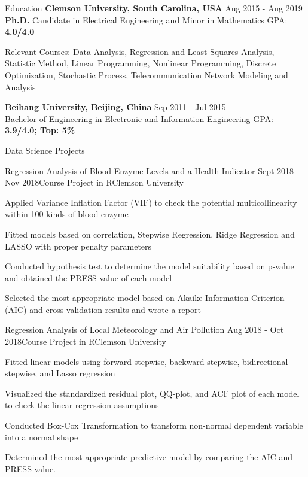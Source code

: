 \documentclass{resume} %
\begin{document}
\begin{rSection}{Education}
{\bf Clemson University, South Carolina, USA} \hfill { Aug 2015 - Aug 2019} \\ 
{\textbf{Ph.D.} Candidate in Electrical Engineering and Minor in Mathematics} \hfill { GPA: \bf 4.0/4.0}


Relevant Courses: Data Analysis, Regression and Least Squares Analysis, Statistic Method, 
Linear Programming, Nonlinear Programming, Discrete Optimization, Stochastic Process, Telecommunication Network Modeling and Analysis


{\bf Beihang University, Beijing, China} \hfill { Sep 2011 - Jul 2015} \\ 
{ Bachelor of Engineering  in Electronic and Information Engineering} \hfill { GPA: \bf 3.9/4.0; Top: 5\%}

\end{rSection}


\begin{rSection}{Data Science Projects}	
	\begin{rSubsection}{Regression Analysis of Blood Enzyme Levels and a Health Indicator}
		{Sept 2018 - Nov 2018}{Course Project in R}{Clemson University}		
		\setlength{\parindent}{2em} \item Applied Variance Inflation Factor (VIF) to check the potential multicollinearity within 100 kinds of blood enzyme		
		\item Fitted models based on correlation, Stepwise Regression, Ridge Regression and LASSO with proper penalty parameters
		\item Conducted hypothesis test to determine the model suitability based on p-value and obtained the PRESS value of each model
		\item Selected the most appropriate model based on Akaike Information Criterion (AIC) and cross validation results and wrote a report		
	\end{rSubsection}	
	
		\begin{rSubsection}{Regression Analysis of Local Meteorology and Air Pollution}
			{Aug 2018 - Oct 2018}{Course Project in R}{Clemson University}		
			\setlength{\parindent}{2em} \item Fitted linear models using forward stepwise, backward stepwise, bidirectional stepwise, and Lasso regression
			\item Visualized the standardized residual plot, QQ-plot, and ACF plot of each model to check the linear regression assumptions
			\item Conducted Box-Cox Transformation to transform non-normal dependent variable into a normal shape
			\item Determined the most appropriate predictive model by comparing the AIC and PRESS value.				
		\end{rSubsection}	
\end{rSection}
\end{document}
